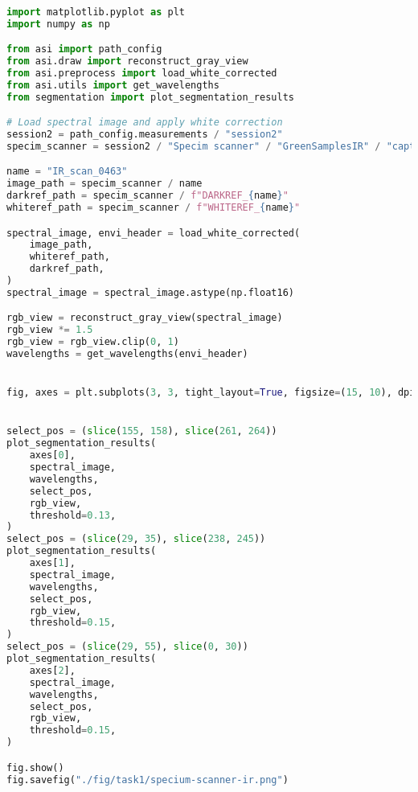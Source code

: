 \begin{lstlisting}[language=python, caption=Segmentation of green materials by Specim Scnaner in infrared wavelengths, label={code:green-specim-ir}]

import matplotlib.pyplot as plt
import numpy as np

from asi import path_config
from asi.draw import reconstruct_gray_view
from asi.preprocess import load_white_corrected
from asi.utils import get_wavelengths
from segmentation import plot_segmentation_results

# Load spectral image and apply white correction
session2 = path_config.measurements / "session2"
specim_scanner = session2 / "Specim scanner" / "GreenSamplesIR" / "capture"

name = "IR_scan_0463"
image_path = specim_scanner / name
darkref_path = specim_scanner / f"DARKREF_{name}"
whiteref_path = specim_scanner / f"WHITEREF_{name}"

spectral_image, envi_header = load_white_corrected(
    image_path,
    whiteref_path,
    darkref_path,
)
spectral_image = spectral_image.astype(np.float16)

rgb_view = reconstruct_gray_view(spectral_image)
rgb_view *= 1.5
rgb_view = rgb_view.clip(0, 1)
wavelengths = get_wavelengths(envi_header)


fig, axes = plt.subplots(3, 3, tight_layout=True, figsize=(15, 10), dpi=80)


select_pos = (slice(155, 158), slice(261, 264))
plot_segmentation_results(
    axes[0],
    spectral_image,
    wavelengths,
    select_pos,
    rgb_view,
    threshold=0.13,
)
select_pos = (slice(29, 35), slice(238, 245))
plot_segmentation_results(
    axes[1],
    spectral_image,
    wavelengths,
    select_pos,
    rgb_view,
    threshold=0.15,
)
select_pos = (slice(29, 55), slice(0, 30))
plot_segmentation_results(
    axes[2],
    spectral_image,
    wavelengths,
    select_pos,
    rgb_view,
    threshold=0.15,
)

fig.show()
fig.savefig("./fig/task1/specium-scanner-ir.png")
\end{lstlisting}
